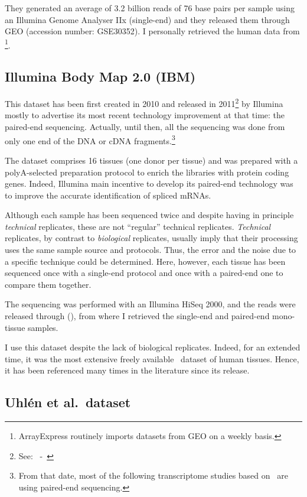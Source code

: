 They generated an average of 3.2 billion reads of 76 base pairs per sample
using an Illumina Genome Analyser IIx (single-end) and they released them
through \gls{GEO} (accession number: GSE30352).
I personally retrieved the human data from
\footnote{ArrayExpress routinely imports
datasets from \gls{GEO} on a weekly basis.}.


\subsection{Illumina Body Map 2.0 (IBM)}
\label{subsec:ibmpresentation}
This dataset has been first created in 2010 and released in
2011\footnote{See:~ -~\cite{ibmEnsembl}} by Illumina
mostly to advertise its most recent technology improvement at that time:
the paired-end sequencing. Actually, until then, all the sequencing was done
from only one end of the \gls{DNA} or \gls{cDNA} fragments.\footnote{From that
date, most of the following transcriptome studies based on \Rnaseq\ are using
paired-end sequencing.}

The dataset comprises 16 tissues (one donor per tissue) and was prepared with a
polyA-selected preparation protocol to enrich the libraries with protein
coding genes. Indeed, Illumina main incentive to develop its paired-end
technology was to improve the accurate identification of spliced \glspl{mRNA}.

Although each sample has been sequenced twice and despite having in principle
\emph{technical} replicates, these are not ``regular'' technical replicates.
\emph{Technical} replicates, by contrast to \emph{biological} replicates,
usually imply that their processing uses the same sample source and protocols.
Thus, the error and the noise due to a specific technique could be determined.
Here, however, each tissue has been sequenced once with a single-end protocol
and once with a paired-end one to compare them together.

The sequencing was performed with an Illumina HiSeq 2000, and the reads were
released through  (), from where I
retrieved the single-end and paired-end mono-tissue samples.

I use this dataset despite the lack of biological replicates.
Indeed, for an extended time,
it was the most extensive freely available \Rnaseq\ dataset of human
tissues. Hence, it has been referenced many times in the literature
since its release.

\subsection{Uhlén et al.\ dataset}\label{subsec:uhlenPresentation}

